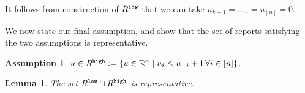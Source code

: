 \documentclass[12pt]{article}
\newcommand{\reals}{\mathbb{R}}
\newcommand{\Y}{\mathcal{Y}}
\newtheorem{lemma}{Lemma}
\newtheorem{assumption}{Assumption}
\begin{document}
It follows from construction of $R^{\tt low}$ that we can take $u_{k+1} = \ldots, = u_{[n]} = 0$.


We now state our final assumption, and show that the set of reports satisfying the two assumptions is representative.
\begin{assumption}\label{assum:top-threshold}
	$u \in R^{\tt high} := \{u \in \reals^n \mid u_i \leq \bar u_{-i} +1 \, \forall i \in [n]\}$.
\end{assumption}

\begin{lemma}\label{lem:top-threshold}
The set $R^{\tt low} \cap R^{\tt high}$ is representative.
\end{lemma}
\end{document}
